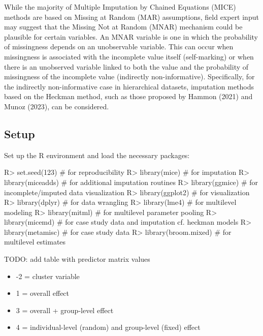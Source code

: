 \documentclass[
]{jss}
\providecommand{\tightlist}{%
  \setlength{\itemsep}{0pt}\setlength{\parskip}{0pt}}
\begin{document}
While the majority of Multiple Imputation by Chained Equations (MICE)
methods are based on Missing at Random (MAR) assumptions, field expert
input may suggest that the Missing Not at Random (MNAR) mechanism could
be plausible for certain variables. An MNAR variable is one in which the
probability of missingness depends on an unobservable variable. This can
occur when missingness is associated with the incomplete value itself
(self-marking) or when there is an unobserved variable linked to both
the value and the probability of missingness of the incomplete value
(indirectly non-informative). Specifically, for the indirectly
non-informative case in hierarchical datasets, imputation methods based
on the Heckman method, such as those proposed by Hammon (2021) and Munoz
(2023), can be considered.

\hypertarget{setup}{%
\subsection{Setup}\label{setup}}

Set up the R environment and load the necessary packages:

\begin{CodeChunk}
\begin{CodeInput}
R> set.seed(123)         # for reproducibility
R> library(mice)         # for imputation
R> library(miceadds)     # for additional imputation routines
R> library(ggmice)       # for incomplete/imputed data visualization
R> library(ggplot2)      # for visualization
R> library(dplyr)        # for data wrangling
R> library(lme4)         # for multilevel modeling
R> library(mitml)        # for multilevel parameter pooling
R> library(micemd)       # for case study data and imputation cf. heckman models
R> library(metamisc)     # for case study data
R> library(broom.mixed)  # for multilevel estimates
\end{CodeInput}
\end{CodeChunk}

TODO: add table with predictor matrix values

\begin{itemize}
\tightlist
\item
  -2 = cluster variable
\item
  1 = overall effect
\item
  3 = overall + group-level effect
\item
  4 = individual-level (random) and group-level (fixed) effect
\end{itemize}
\end{document}
